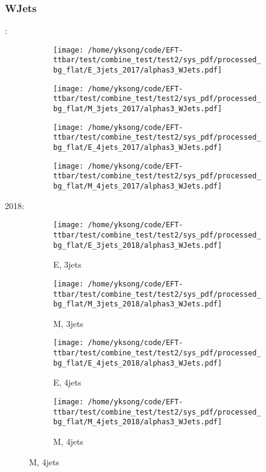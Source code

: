 \documentclass{beamer}
\begin{document}
\begin{frame}
\frametitle{WJets}
\fontsize{5}{1}:
\begin{figure}
\centering
\begin{subfigure}[b]{0.24\textwidth}
\texttt{[image: /home/yksong/code/EFT-ttbar/test/combine\_test/test2/sys\_pdf/processed\_bg\_flat/E\_3jets\_2017/alphas3\_WJets.pdf]}
\end{subfigure}
\begin{subfigure}[b]{0.24\textwidth}
\texttt{[image: /home/yksong/code/EFT-ttbar/test/combine\_test/test2/sys\_pdf/processed\_bg\_flat/M\_3jets\_2017/alphas3\_WJets.pdf]}
\end{subfigure}
\begin{subfigure}[b]{0.24\textwidth}
\texttt{[image: /home/yksong/code/EFT-ttbar/test/combine\_test/test2/sys\_pdf/processed\_bg\_flat/E\_4jets\_2017/alphas3\_WJets.pdf]}
\end{subfigure}
\begin{subfigure}[b]{0.24\textwidth}
\texttt{[image: /home/yksong/code/EFT-ttbar/test/combine\_test/test2/sys\_pdf/processed\_bg\_flat/M\_4jets\_2017/alphas3\_WJets.pdf]}
\end{subfigure}
\end{figure}
2018:
\begin{figure}
\centering
\begin{subfigure}[b]{0.24\textwidth}
\texttt{[image: /home/yksong/code/EFT-ttbar/test/combine\_test/test2/sys\_pdf/processed\_bg\_flat/E\_3jets\_2018/alphas3\_WJets.pdf]}
\captionsetup{font=tiny}
\caption{E, 3jets}
\end{subfigure}
\begin{subfigure}[b]{0.24\textwidth}
\texttt{[image: /home/yksong/code/EFT-ttbar/test/combine\_test/test2/sys\_pdf/processed\_bg\_flat/M\_3jets\_2018/alphas3\_WJets.pdf]}
\captionsetup{font=tiny}
\caption{M, 3jets}
\end{subfigure}
\begin{subfigure}[b]{0.24\textwidth}
\texttt{[image: /home/yksong/code/EFT-ttbar/test/combine\_test/test2/sys\_pdf/processed\_bg\_flat/E\_4jets\_2018/alphas3\_WJets.pdf]}
\captionsetup{font=tiny}
\caption{E, 4jets}
\end{subfigure}
\begin{subfigure}[b]{0.24\textwidth}
\texttt{[image: /home/yksong/code/EFT-ttbar/test/combine\_test/test2/sys\_pdf/processed\_bg\_flat/M\_4jets\_2018/alphas3\_WJets.pdf]}
\captionsetup{font=tiny}
\caption{M, 4jets}
\end{subfigure}
\end{figure}
\end{frame}
\end{document}
